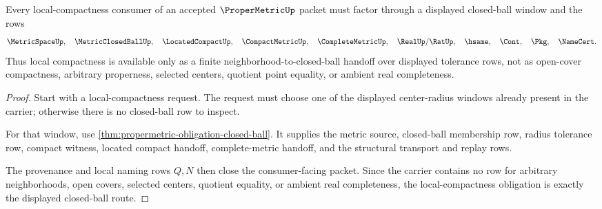 \begin{theorem}
\label{thm:propermetric-obligation-local-compactness}
Every local-compactness consumer of an accepted $\ProperMetricUp$ packet must factor through a displayed closed-ball window and the rows
$$
\MetricSpaceUp,\quad
\MetricClosedBallUp,\quad
\LocatedCompactUp,\quad
\CompactMetricUp,\quad
\CompleteMetricUp,\quad
\RealUp/\RatUp,\quad
\hsame,\quad
\Cont,\quad
\Pkg,\quad
\NameCert .
$$
Thus local compactness is available only as a finite neighborhood-to-closed-ball handoff over displayed tolerance rows, not as open-cover compactness, arbitrary properness, selected centers, quotient point equality, or ambient real completeness.
\end{theorem}
\begin{proof}
Start with a local-compactness request. The request must choose one of the displayed center-radius windows already present in the carrier; otherwise there is no closed-ball row to inspect.

For that window, use \autoref{thm:propermetric-obligation-closed-ball}. It supplies the metric source, closed-ball membership row, radius tolerance row, compact witness, located compact handoff, complete-metric handoff, and the structural transport and replay rows.

The provenance and local naming rows $Q,N$ then close the consumer-facing packet. Since the carrier contains no row for arbitrary neighborhoods, open covers, selected centers, quotient equality, or ambient real completeness, the local-compactness obligation is exactly the displayed closed-ball route.
\end{proof}

